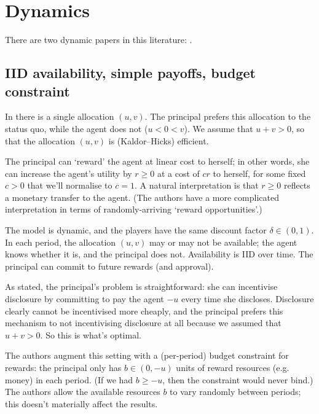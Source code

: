 \section{Dynamics}
\label{sec:ch4:dynamics}

There are two dynamic papers in this literature: \textcite{BirdFrug2019,sfb}.



\subsection{IID availability, simple payoffs, budget constraint}
\label{sec:ch4:dynamics:birdfrug}

In \textcite{BirdFrug2019} there is a single allocation $(u,v)$.
The principal prefers this allocation to the status quo,
while the agent does not ($u<0<v$).
We assume that $u+v>0$, so that the allocation $(u,v)$ is (Kaldor--Hicks) efficient.

The principal can `reward' the agent at linear cost to herself;
in other words, she can increase the agent's utility by $r \geq 0$ at a cost of $c r$ to herself, for some fixed $c>0$ that we'll normalise to $c=1$.
A natural interpretation is that $r \geq 0$ reflects a monetary transfer to the agent. (The authors have a more complicated interpretation in terms of randomly-arriving `reward opportunities'.)

The model is dynamic, and the players have the same discount factor $\delta \in (0,1)$. In each period, the allocation $(u,v)$ may or may not be available; the agent knows whether it is, and the principal does not.
Availability is IID over time.
The principal can commit to future rewards (and approval).

As stated, the principal's problem is straightforward:
she can incentivise disclosure by committing to pay the agent $-u$ every time she discloses. Disclosure clearly cannot be incentivised more cheaply, and the principal prefers this mechanism to not incentivising disclosure at all because we assumed that $u+v>0$. So this is what's optimal.

The authors augment this setting with a (per-period) budget constraint for rewards:
the principal only has $b \in (0,-u)$ units of reward resources (e.g. money) in each period. (If we had $b \geq -u$, then the constraint would never bind.)
The authors allow the available resources $b$ to vary randomly between periods;
this doesn't materially affect the results.

